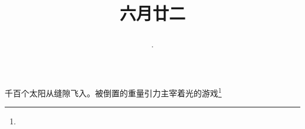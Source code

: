 \title{\date[d=27,m=7,y=2024][year:cn-y,年,month:cn,day:cn,日,·,weekday]·六月廿二 }
千百个太阳从缝隙飞入。被倒置的重量引力主宰着光的游戏\footnote{ }

